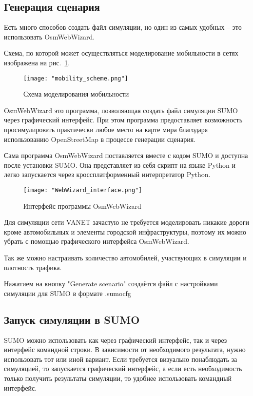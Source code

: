 \subsection*{Генерация сценария}

Есть много способов создать файл симуляции, но один из самых удобных – это использовать OsmWebWizard. 

Схема, по которой может осуществляться моделирование мобильности в сетях изображена на рис.~\ref{fig:mobility_scheme}.

\begin{figure}
 \centering
 \texttt{[image: "mobility\_scheme.png"]}
 \caption{Схема моделирования мобильности}
 \label{fig:mobility_scheme}
\end{figure}

OsmWebWizard это программа, позволяющая создать файл симуляции SUMO через графический интерфейс. При этом программа предоставляет возможность просимулировать практически любое место на карте мира благодаря использованию OpenStreetMap в процессе генерации сценария.

Сама программа OsmWebWizard поставляется вместе с кодом SUMO и доступна после установки SUMO. Она представляет из себя скрипт на языке Python и легко запускается через кроссплатформенный интерпретатор Python.

\begin{figure}
 \centering
 \texttt{[image: "WebWizard\_interface.png"]}
 \caption{Интерфейс программы OsmWebWizard}
 \label{fig:webwizard_interface}
\end{figure}

Для симуляции сети VANET зачастую не требуется моделировать никакие дороги кроме автомобильных и элементы городской инфраструктуры, поэтому их можно убрать с помощью графического интерфейса OsmWebWizard. 

Так же можно настраивать количество автомобилей, участвующих в симуляции и плотность трафика.

Нажатием на кнопку "Generate scenario" создаётся файл с настройками симуляции для SUMO в формате .sumocfg

\subsection*{Запуск симуляции в SUMO}

SUMO можно использовать как через графический интерфейс, так и через интерфейс командной строки. В зависимости от необходимого результата, нужно использовать тот или иной вариант. Если требуется визуально понаблюдать за симуляцией, то запускается графический интерфейс, а если есть необходимость только получить результаты симуляции, то удобнее использовать командный интерфейс.

